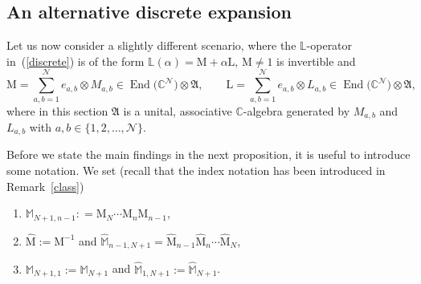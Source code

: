 \documentclass[pdftex]{sigma}
\numberwithin{equation}{section}
\newcounter{diff_order}
\newcounter{diff_power}
\theoremstyle{definition}
\DeclareMathOperator{\EEnd}{End}%
\begin{document}
\subsection{An alternative discrete expansion}\label{section3.1}
 {Let us now consider a slightly different scenario, where the ${\mathbb L}$-operator in~(\ref{discrete}) is of the form ${\mathbb L}(\alpha) = {\mathrm M} + \alpha {\mathrm L}$, ${\mathrm M} \neq 1$ is invertible and
\[
{\mathrm M} = \sum_{a,b =1}^{\mathcal N} e_{a,b} \otimes M_{a,b} \in \EEnd\bigl({\mathbb C}^{\mathcal N}\bigr) \otimes {\mathfrak A},\qquad
{\mathrm L} = \sum_{a,b =1}^{\mathcal N} e_{a,b} \otimes L_{a,b} \in \EEnd\bigl({\mathbb C}^{\mathcal N}\bigr) \otimes {\mathfrak A},
\]
 where in this section ${\mathfrak A}$ is a unital, associative ${\mathbb C}$-algebra generated by $M_{a,b}$ and $L_{a,b}$ with ${a,b \in \{1,2,\dots, {\mathcal N}\}}$.}

Before we state the main findings in the next proposition, it is useful to introduce some notation. We set (recall that the index notation has been introduced in Remark~\ref{class})
\begin{enumerate}\itemsep=0pt
\item[(1)] ${\mathbb M}_{N+1, n-1}: = {\mathrm M}_N \cdots {\mathrm M}_{n} {\mathrm M}_{n-1}$,
\item[(2)] $\hat {\mathrm M} := {\mathrm M}^{-1}$ and $\hat {\mathbb M}_{n-1, N+1} =\hat {\mathrm M}_{n-1} \hat {\mathrm M}_{n} \cdots \hat {\mathrm M}_N$,
\item[(3)] ${\mathbb M}_{N+1, 1} :={\mathbb M}_{N+1}$ and $\hat {\mathbb M}_{1,N+1} := \hat {\mathbb M}_{N+1}$.
\end{enumerate}
\end{document}
